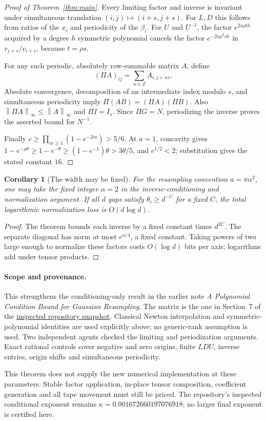 \documentclass[11pt]{article}
\newtheorem{corollary}[theorem]{Corollary}
\newcommand{\norm}[1]{\left\lVert#1\right\rVert_\infty}
\newcommand{\Z}{\mathbb Z}
\begin{document}
\begin{proof}[Proof of Theorem~\ref{thm:main}]
Every limiting factor and inverse is invariant under simultaneous
translation $(i,j)\mapsto(i+s,j+s)$. For $L,D$ this follows from
ratios of the $x_i$ and periodicity of the $\beta_i$.
For $U$ and $U^{-1}$, the factor $e^{2a\rho t h}$ acquired by a degree
$h$ symmetric polynomial cancels the factor $e^{-2a\rho^2s h}$ in
$v_{j+s}/v_{i+s}$, because $t=\rho s$.

For any such periodic, absolutely row-summable matrix $A$, define
\[
 (\Pi A)_{ij}=\sum_{n\in\Z} A_{i,j+ns}.
\]
Absolute convergence, decomposition of an intermediate index modulo
$s$, and simultaneous periodicity imply
$\Pi(AB)=(\Pi A)(\Pi B)$. Also
$\norm{\Pi A}\le\norm A$ and $\Pi I=I_s$.
Since $\Pi G=N$, periodizing the inverse proves the asserted bound for
$N^{-1}$.

Finally $c\ge\prod_{m\ge1}(1-e^{-2m})>5/6$.
At $a=1$, concavity gives
$1-e^{-\rho\theta}\ge1-e^{-\theta}\ge(1-e^{-1})\theta>3\theta/5$,
and $e^{1/2}<2$; substitution gives the stated constant $16$.
\end{proof}

\begin{corollary}[The width may be fixed]
For the resampling convention $a=\pi\alpha^2$, one may take the fixed
integer $\alpha=2$ in the inverse-conditioning and normalization
argument. If all $d$ gaps satisfy $\theta_i\ge d^{-C}$ for a fixed $C$,
the total logarithmic normalization loss is $O(d\log d)$.
\end{corollary}
\begin{proof}
The theorem bounds each inverse by a fixed constant times $d^{2C}$.
The separate diagonal has norm at most $e^{a/4}$, a fixed constant.
Taking powers of two large enough to normalize these factors costs
$O(\log d)$ bits per axis; logarithms add under tensor products.
\end{proof}

\paragraph{Scope and provenance.}
This strengthens the conditioning-only result in the earlier note
\emph{A Polynomial Condition Bound for Gaussian Resampling}. The
matrix is the one in Section~7 of the
\href{https://github.com/CrocSwap/integer-mult-bounds/tree/e6f9716621f4e01fc190617934cdfaf072bd976f}{inspected repository snapshot}.
Classical Newton interpolation and symmetric-polynomial identities are
used explicitly above; no generic-rank assumption is used. Two independent
agents checked the limiting and periodization arguments. Exact rational
controls cover negative and zero origins, finite $LDU$, inverse entries,
origin shifts and simultaneous periodicity.

This theorem does not supply the new numerical implementation at these
parameters. Stable factor application, in-place tensor composition,
coefficient generation and all tape movement must still be priced.
The repository's inspected conditional exponent remains
$\kappa=0.001672660197076918$; no larger final exponent is certified here.
\end{document}
